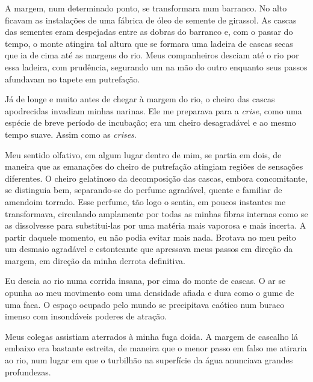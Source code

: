 A margem, num determinado ponto, se transformara num barranco. No alto ficavam
as instalações de uma fábrica de óleo de semente de girassol. As cascas das
sementes eram despejadas entre as dobras do barranco e, com o passar do
tempo, o monte atingira tal altura que se formara uma ladeira de cascas secas
que ia de cima até as margens do rio. Meus companheiros desciam até o rio por
essa ladeira, com prudência, segurando um na mão do outro enquanto seus
passos afundavam no tapete em putrefação.


Já de longe e muito antes de chegar à margem do rio, o cheiro das cascas
apodrecidas invadiam minhas narinas. Ele me preparava para a \textit
{crise}, como uma espécie de breve período de incubação; era um cheiro
desagradável e ao mesmo tempo suave. Assim como as \textit{crises}.

Meu sentido olfativo, em algum lugar dentro de mim, se partia em dois, de
maneira que as emanações do cheiro de putrefação atingiam regiões de
sensações diferentes. O cheiro gelatinoso da decomposição das cascas, embora
concomitante, se distinguia bem, separando-se do perfume agradável, quente e
familiar de amendoim torrado. Esse perfume, tão logo o sentia, em poucos
instantes me transformava, circulando amplamente por todas as minhas fibras
internas como se as dissolvesse para substitui-las por uma matéria mais
vaporosa e mais incerta. A partir daquele momento, eu não podia evitar mais
nada. Brotava no meu peito um desmaio agradável e estonteante que apressava
meus passos em direção da margem, em direção da minha derrota definitiva.

Eu descia ao rio numa corrida insana, por cima do monte de cascas. O ar se
opunha ao meu movimento com uma densidade afiada e dura como o gume de uma
faca. O espaço ocupado pelo mundo se precipitava caótico num buraco imenso
com insondáveis poderes de atração.

Meus colegas assistiam aterrados à minha fuga doida. A margem de cascalho lá
embaixo era bastante estreita, de maneira que o menor passo em falso me
atiraria ao rio, num lugar em que o turbilhão na superfície da água anunciava
grandes profundezas.

